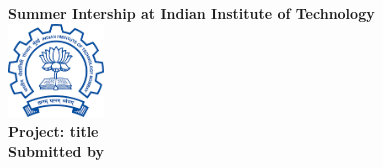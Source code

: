 \documentclass{article}
\begin{document}
    \begin{titlepage}
        \begin{center}
            \huge
            \textbf{Summer Intership at Indian Institute of Technology}\\
            \medskip
            \includegraphics[width=1in]{iit}\\
            \vfill
            \LARGE
            \textbf{Project: title} \\
            \Large
            \vfill
            \textbf{Submitted by}\\
        

\end{center}
\end{titlepage}
\end{document}
